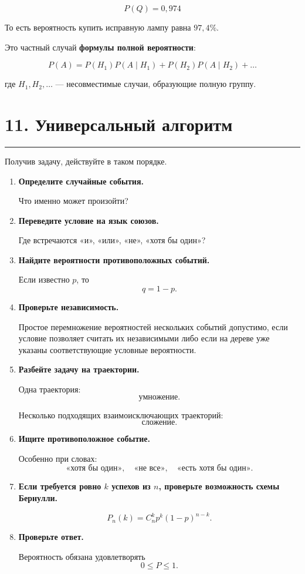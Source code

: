 \documentclass[a4paper,12pt]{article}
\newcommand{\accentline}{%
    \vspace{0.3em}
    {\color{accent}\rule{\linewidth}{0.7pt}}
    \vspace{0.5em}
}
\newcommand{\important}[1]{\textbf{\color{darkaccent}#1}}
\begin{document}
\[
\boxed{P(Q)=0,974}
\]

То есть вероятность купить исправную лампу равна $97,4\%$.

Это частный случай \important{формулы полной вероятности}:

\[
\boxed{
P(A)
=
P(H_1)P(A\mid H_1)
+
P(H_2)P(A\mid H_2)
+\ldots
}
\]

где $H_1,H_2,\ldots$ --- несовместимые случаи, образующие полную группу.


\section*{\color{darkaccent}11. Универсальный алгоритм}
\accentline

Получив задачу, действуйте в таком порядке.

\begin{enumerate}
    \item \important{Определите случайные события.}

    Что именно может произойти?

    \item \important{Переведите условие на язык союзов.}

    Где встречаются «и», «или», «не», «хотя бы один»?

    \item \important{Найдите вероятности противоположных событий.}

    Если известно $p$, то
    \[
    q=1-p.
    \]

    \item \important{Проверьте независимость.}

    Простое перемножение вероятностей нескольких событий допустимо, если
    условие позволяет считать их независимыми либо если на дереве уже
    указаны соответствующие условные вероятности.

    \item \important{Разбейте задачу на траектории.}

    Одна траектория:
    \[
    \text{умножение}.
    \]

    Несколько подходящих взаимоисключающих траекторий:
    \[
    \text{сложение}.
    \]

    \item \important{Ищите противоположное событие.}

    Особенно при словах:
    \[
    \text{«хотя бы один»},\quad
    \text{«не все»},\quad
    \text{«есть хотя бы один»}.
    \]

    \item \important{Если требуется ровно $k$ успехов из $n$, проверьте
    возможность схемы Бернулли.}

    \[
    P_n(k)=C_n^kp^k(1-p)^{n-k}.
    \]

    \item \important{Проверьте ответ.}

    Вероятность обязана удовлетворять
    \[
    0\le P\le1.
    \]
\end{enumerate}
\end{document}
